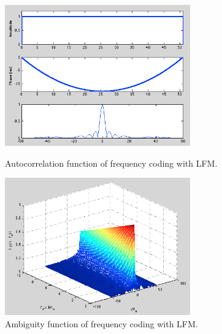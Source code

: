 \documentclass{article}
\begin{document}
\begin{figure}[tbh]
\begin{minipage}[t]{0.5\linewidth}
\centering
\includegraphics[width=8cm]{Figures/lfm_data.png}
\caption{Autocorrelation function of frequency coding with LFM.}
\label{fig:lfm_data}
\end{minipage}
\begin{minipage}[t]{0.5\linewidth}
\centering
\includegraphics[width=8cm]{Figures/lfm_3d.png}
\caption{Ambiguity function of frequency coding with LFM.}
\label{fig:lfm_3d}
\end{minipage}
\end{figure}
\end{document}
